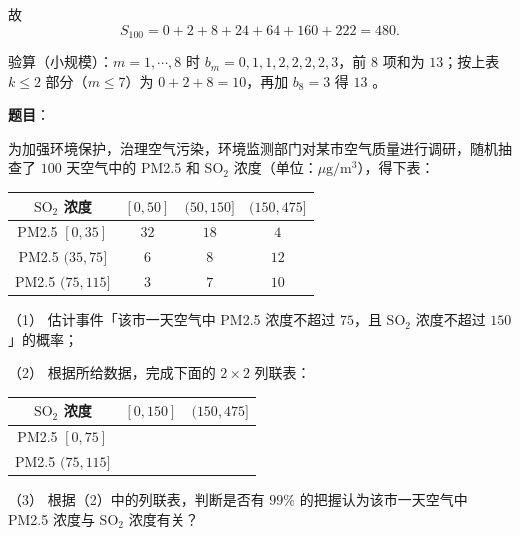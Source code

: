 \begin{answer}
故
\nopagebreak[4]
\[S_{100}=0+2+8+24+64+160+222=480 .\]

验算（小规模）：$m=1,\cdots,8$ 时 $b_m=0,1,1,2,2,2,2,3$，前 $8$ 项和为 $13$；按上表 $k\leqslant2$ 部分（$m\leqslant7$）为 $0+2+8=10$，再加 $b_8=3$ 得 $13$ 。



\end{answer}
\begin{answer}

\textbf{题目}：

为加强环境保护，治理空气污染，环境监测部门对某市空气质量进行调研，随机抽查了 $100$ 天空气中的 PM2.5 和 $\mathrm{SO_2}$ 浓度（单位：$\mu\mathrm g/\mathrm m^3$），得下表：

\begin{center}
\begin{tabular}{cccc}
\toprule
$\mathrm{SO_2}$ 浓度 & $[0,50]$ & $(50,150]$ & $(150,475]$ \\
\midrule
PM2.5 $[0,35]$ & $32$ & $18$ & $4$ \\
PM2.5 $(35,75]$ & $6$ & $8$ & $12$ \\
PM2.5 $(75,115]$ & $3$ & $7$ & $10$ \\
\bottomrule
\end{tabular}
\end{center}

（1） 估计事件「该市一天空气中 PM2.5 浓度不超过 $75$，且 $\mathrm{SO_2}$ 浓度不超过 $150$」的概率；

（2） 根据所给数据，完成下面的 $2\times2$ 列联表：

\begin{center}
\begin{tabular}{ccc}
\toprule
$\mathrm{SO_2}$ 浓度 & $[0,150]$ & $(150,475]$ \\
\midrule
PM2.5 $[0,75]$ &  &  \\
PM2.5 $(75,115]$ &  &  \\
\bottomrule
\end{tabular}
\end{center}

（3） 根据（2）中的列联表，判断是否有 $99\%$ 的把握认为该市一天空气中 PM2.5 浓度与 $\mathrm{SO_2}$ 浓度有关？


\end{answer}
